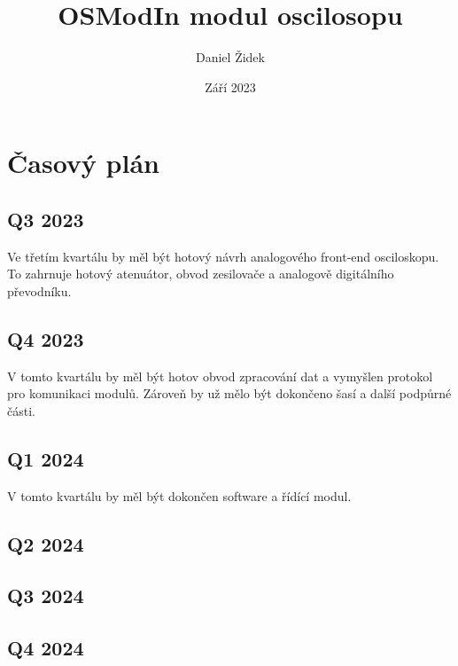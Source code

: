 \documentclass[12pt]{article}
\title{OSModIn modul oscilosopu}
\author{Daniel Židek}
\date{Září 2023}
\renewcommand{\listfigurename}{Seznam obrázků}
\renewcommand{\listtablename}{Seznam tabulek}
\begin{document}





\setcounter{page}{2}

\tableofcontents

\newpage

\renewcommand{\listfigurename}{Seznam obrázků}
\listoffigures

\newpage

\renewcommand{\listtablename}{Seznam tabulek}
\listoftables

\newpage

\section{Časový plán}

\subsection{Q3 2023}

Ve třetím kvartálu by měl být hotový návrh analogového front-end osciloskopu.
To zahrnuje hotový atenuátor, obvod zesilovače a analogově digitálního převodníku.

\subsection{Q4 2023}

V tomto kvartálu by měl být hotov obvod zpracování dat a vymyšlen protokol pro
komunikaci modulů. Zároveň by už mělo být dokončeno šasí a další podpůrné části.

\subsection{Q1 2024}

V tomto kvartálu by měl být dokončen software a řídící modul.

\subsection{Q2 2024}

\subsection{Q3 2024}

\subsection{Q4 2024}
\end{document}
